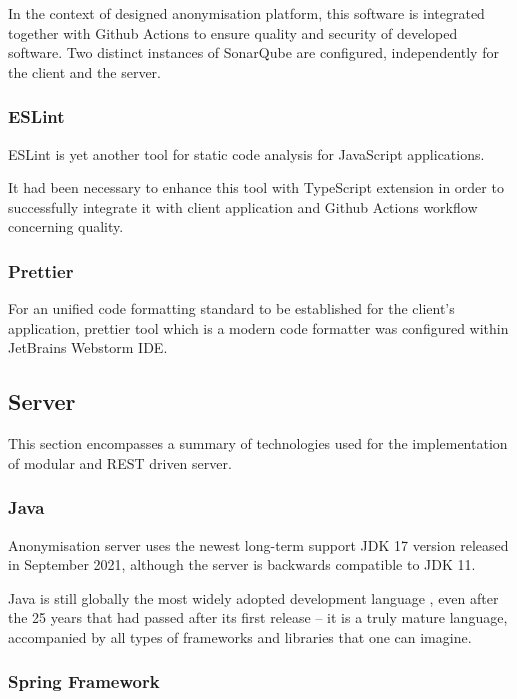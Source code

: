 \documentclass[a4paper,twoside,12pt]{book}
\begin{document}
In the context of designed anonymisation platform, this software is integrated together with Github Actions to ensure quality and security of developed software. Two distinct instances of SonarQube are configured, independently for the client and the server.

\subsubsection{ESLint}

ESLint is yet another tool for static code analysis for JavaScript applications.

It had been necessary to enhance this tool with TypeScript extension in order to successfully integrate it with client application and Github Actions workflow concerning quality.

\subsubsection{Prettier}

For an unified code formatting standard to be established for the client's application, prettier tool which is a modern code formatter was configured within JetBrains Webstorm IDE.

\subsection{Server}

This section encompasses a summary of technologies used for the implementation of modular and REST driven server.

\subsubsection{Java}

Anonymisation server uses the newest long-term support JDK 17 version released in September 2021, although the server is backwards compatible to JDK 11.

Java is still globally the most widely adopted development language \cite{bib:java25years}, even after the 25 years that had passed after its first release – it is a truly mature language, accompanied by all types of frameworks and libraries that one can imagine.

\subsubsection{Spring Framework}
\end{document}

